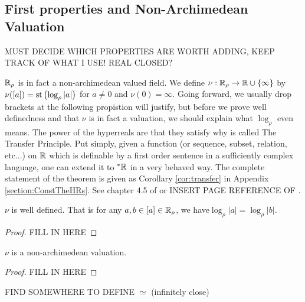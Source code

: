 \documentclass[draft]{amsart}
\DeclareMathOperator{\st}{st}
\begin{document}
\subsection{First properties and Non-Archimedean Valuation}
MUST DECIDE WHICH PROPERTIES ARE WORTH ADDING, KEEP TRACK OF WHAT I USE! REAL CLOSED? 


    \( \mathbb{R}_\rho \) is in fact a non-archimedean valued field. We define \(\nu: \mathbb{R}_\rho \to \mathbb{R}\cup \{\infty\}\) by \(\nu([a])=\st \p{\log_\rho |a|}\) for \(a\ne 0\) and \(\nu(0)=\infty\).  Going forward, we usually drop brackets at the following propistion will justify, but before we prove well definedness and that \(\nu\) is in fact a valuation, we should explain what \(\log_\rho\) even means. The power of the hyperreals are that they satisfy why is called The Transfer Principle. Put simply, given a function (or sequence, subset, relation, etc...) on \(\mathbb{R}\) which is definable by a first order sentence in a sufficiently complex language, one can extend it to \(^*\mathbb{R}\) in a very behaved way. The complete statement of the theorem is given as Corollary \ref{cor:transfer} in Appendix \ref{section:ConstTheHRs}. See chapter 4.5 of \cite{Goldblatt_1998} or INSERT PAGE REFERENCE OF \cite{Lightstone_Robinson_1975}.


    \begin{prop}\label{prop:wellDefOfVal}
        \(\nu\) is well defined. That is for any \(a,b\in [a]\in \mathbb{R}_\rho\), we have\(\log_\rho|a|=\log_\rho |b|\).
    \end{prop}
    \begin{proof}
        FILL IN HERE
    \end{proof}

    \begin{prop}\label{prop:nuIsVal}
        \(\nu\) is a non-archimedean valuation.
    \end{prop}
    \begin{proof}
        FILL IN HERE
    \end{proof}
    FIND SOMEWHERE TO DEFINE \(\simeq\) (infinitely close)
\end{document}

